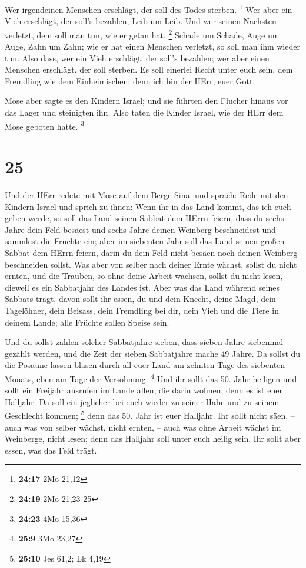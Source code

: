  Wer irgendeinen Menschen erschlägt, der soll des Todes
sterben. \footnote{\textbf{24:17} 2Mo 21,12}  Wer aber ein
Vieh erschlägt, der soll's bezahlen, Leib um Leib.  Und wer
seinen Nächsten verletzt, dem soll man tun, wie er getan hat,
\footnote{\textbf{24:19} 2Mo 21,23-25}  Schade um Schade,
Auge um Auge, Zahn um Zahn; wie er hat einen Menschen verletzt, so soll
man ihm wieder tun.  Also dass, wer ein Vieh erschlägt, der
soll's bezahlen; wer aber einen Menschen erschlägt, der soll sterben.
 Es soll einerlei Recht unter euch sein, dem Fremdling wie
dem Einheimischen; denn ich bin der HErr, euer Gott.

 Mose aber sagte es den Kindern Israel; und sie führten den
Flucher hinaus vor das Lager und steinigten ihn. Also taten die Kinder
Israel, wie der HErr dem Mose geboten hatte. \footnote{\textbf{24:23}
  4Mo 15,36}

\hypertarget{section-5}{%
\section{25}\label{section-5}}

 Und der HErr redete mit Mose auf dem Berge Sinai und
sprach:  Rede mit den Kindern Israel und sprich zu ihnen:
Wenn ihr in das Land kommt, das ich euch geben werde, so soll das Land
seinen Sabbat dem HErrn feiern,  dass du sechs Jahre dein
Feld besäest und sechs Jahre deinen Weinberg beschneidest und sammlest
die Früchte ein;  aber im siebenten Jahr soll das Land
seinen großen Sabbat dem HErrn feiern, darin du dein Feld nicht besäen
noch deinen Weinberg beschneiden sollst.  Was aber von
selber nach deiner Ernte wächst, sollst du nicht ernten, und die
Trauben, so ohne deine Arbeit wachsen, sollst du nicht lesen, dieweil es
ein Sabbatjahr des Landes ist.  Aber was das Land während
seines Sabbats trägt, davon sollt ihr essen, du und dein Knecht, deine
Magd, dein Tagelöhner, dein Beisass, dein Fremdling bei dir,
 dein Vieh und die Tiere in deinem Lande; alle Früchte
sollen Speise sein.

 Und du sollst zählen solcher Sabbatjahre sieben, dass
sieben Jahre siebenmal gezählt werden, und die Zeit der sieben
Sabbatjahre mache 49 Jahre.  Da sollst du die Posaune lassen
blasen durch all euer Land am zehnten Tage des siebenten Monats, eben am
Tage der Versöhnung. \footnote{\textbf{25:9} 3Mo 23,27} 
Und ihr sollt das 50. Jahr heiligen und sollt ein Freijahr ausrufen im
Lande allen, die darin wohnen; denn es ist euer Halljahr. Da soll ein
jeglicher bei euch wieder zu seiner Habe und zu seinem Geschlecht
kommen; \footnote{\textbf{25:10} Jes 61,2; Lk 4,19}  denn
das 50. Jahr ist euer Halljahr. Ihr sollt nicht säen, -- auch was von
selber wächst, nicht ernten, -- auch was ohne Arbeit wächst im
Weinberge, nicht lesen;  denn das Halljahr soll unter euch
heilig sein. Ihr sollt aber essen, was das Feld trägt.

